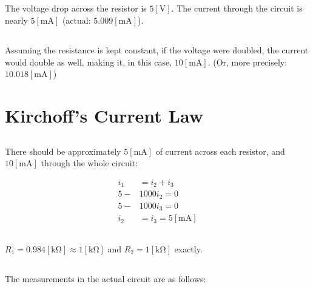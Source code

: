 \documentclass[
	letterpaper, %
	10pt, %
]{CSUniSchoolLabReport}
\begin{document}
\subsection{}

The voltage drop across the resistor is $5[\si{\volt}]$. The current through the circuit is nearly $5[\si{\milli\ampere}]$ (actual: $5.009[\si{\milli\ampere}]$).

\subsection{}

Assuming the resistance is kept constant, if the voltage were doubled, the current would double as well, making it, in this case, $10[\si{\milli\ampere}]$. (Or, more precisely: $10.018[\si{\milli\ampere}]$)

\section{Kirchoff's Current Law}

\subsection{}

There should be approximately $5[\si{\milli\ampere}]$ of current across each resistor, and $10[\si{\milli\ampere}]$ through the whole circuit:

\begin{equation}
  \begin{split}
    i_1&=i_2+i_3\\
    5-&1000i_2=0\\
    5-&1000i_3=0\\
    i_2&=i_3=5[\si{\milli\ampere}]
  \end{split}
  \label{eq:2}
\end{equation}

\subsection{}

$R_1=0.984[\si{\kilo\ohm}]\approx1[\si{\kilo\ohm}]$ and $R_2=1[\si{\kilo\ohm}]$ exactly.

\subsection{}

The measurements in the actual circuit are as follows:
\end{document}
